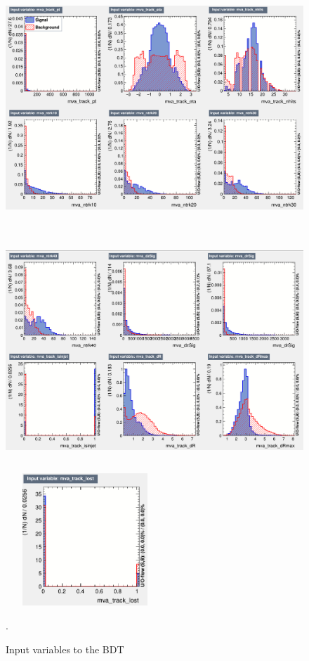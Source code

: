 \documentclass{cernatlasnote}
\begin{document}
\begin{figure}[ht]
\centering
\includegraphics[height=9cm, width=14cm, trim= 0cm 0cm 0cm 0cm,clip]{images/TRKBDT/BDTDaniel_VAR1.png}
\includegraphics[height=9cm, width=14cm, trim= 0cm 0cm 0cm 0cm,clip]{images/TRKBDT/BDTDaniel_VAR2.png}
\includegraphics[height=5cm, width=6cm, trim= 0cm 0cm 0cm 0cm,clip]{images/TRKBDT/BDTDaniel_VAR3.png}
\caption{\label{fig:TRKInputs} Input variables to the BDT}.
\end{figure} 
\end{document}
